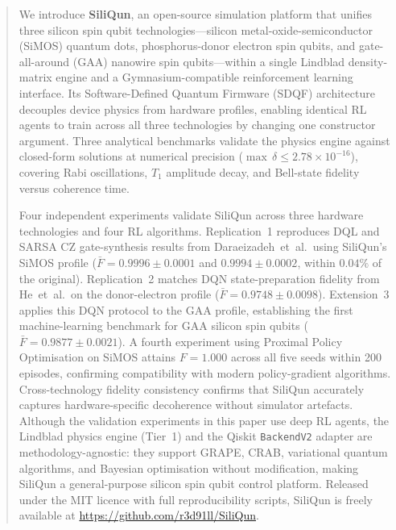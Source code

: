 \documentclass{iopjournal}
\begin{document}
\begin{abstract}
We introduce \textbf{SiliQun}, an open-source simulation platform that unifies
three silicon spin qubit technologies---silicon metal-oxide-semiconductor (SiMOS)
quantum dots, phosphorus-donor electron spin qubits, and gate-all-around (GAA)
nanowire spin qubits---within a single Lindblad density-matrix engine and a
Gymnasium-compatible reinforcement learning interface. Its Software-Defined
Quantum Firmware (SDQF) architecture decouples device physics from hardware
profiles, enabling identical RL agents to train across all three technologies
by changing one constructor argument. Three analytical benchmarks validate the
physics engine against closed-form solutions at numerical precision
($\max\,\delta \leq 2.78 \times 10^{-16}$), covering Rabi oscillations,
$T_1$ amplitude decay, and Bell-state fidelity versus coherence time.

Four independent experiments validate SiliQun across three hardware technologies
and four RL algorithms. Replication~1 reproduces DQL and SARSA CZ gate-synthesis
results from Daraeizadeh~et~al.\ using SiliQun's SiMOS profile
($\bar{F} = 0.9996 \pm 0.0001$ and $0.9994 \pm 0.0002$, within $0.04\%$ of the
original). Replication~2 matches DQN state-preparation fidelity from He~et~al.\
on the donor-electron profile ($\bar{F} = 0.9748 \pm 0.0098$). Extension~3
applies this DQN protocol to the GAA profile, establishing the first
machine-learning benchmark for GAA silicon spin qubits
($\bar{F} = 0.9877 \pm 0.0021$). A fourth experiment using Proximal Policy
Optimisation on SiMOS attains $F = 1.000$ across all five seeds within 200
episodes, confirming compatibility with modern policy-gradient algorithms.
Cross-technology fidelity consistency confirms that SiliQun accurately captures hardware-specific decoherence without simulator artefacts. Although the validation experiments in this paper use deep RL agents, the Lindblad physics engine (Tier~1) and the Qiskit \texttt{BackendV2} adapter are methodology-agnostic: they support GRAPE, CRAB, variational quantum algorithms, and Bayesian optimisation without modification, making SiliQun a general-purpose silicon spin qubit control platform. Released under the MIT licence with full reproducibility scripts, SiliQun is freely available at \url{https://github.com/r3d91ll/SiliQun}.
\end{abstract}


\end{document}
